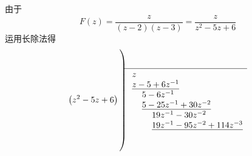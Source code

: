 \solve 由于
\[
F(z) = \dfrac{z}{(z-2)(z-3)} = \dfrac{z}{z^2 -5z + 6} 
\]
运用长除法得
\[\left( {{z^2} - 5z + 6} \right)\mathop{\left){\vphantom{1\begin{array}{l}
z\\
\underline {z - 5 + 6{z^{ - 1}}} \\
\quad {\mkern 1mu} {\mkern 1mu} {\mkern 1mu} 5 - 6{z^{ - 1}}\\
\quad {\mkern 1mu} {\mkern 1mu} {\mkern 1mu} \underline {5 - 25{z^{ - 1}} + 30{z^{ - 2}}} \\
\quad \quad {\mkern 1mu} {\mkern 1mu} {\mkern 1mu} {\mkern 1mu} {\mkern 1mu} {\mkern 1mu} 19{z^{ - 1}} - 30{z^{ - 2}}\\
\quad \quad {\mkern 1mu} {\mkern 1mu} {\mkern 1mu} {\mkern 1mu} {\mkern 1mu} {\mkern 1mu} \underline {19{z^{ - 1}} - 95{z^{ - 2}} + 114{z^{ - 3}}} \\
\quad \quad \quad \quad \quad {\mkern 1mu} {\mkern 1mu} {\mkern 1mu} {\mkern 1mu} {\mkern 1mu} 65{z^{ - 2}} - 114{z^{ - 3}}\\
\quad \quad \quad \quad \quad {\mkern 1mu} {\mkern 1mu} {\mkern 1mu} {\mkern 1mu} {\mkern 1mu} \underline {65{z^{ - 2}} - 325{z^{ - 3}} + 390{z^{ - 4}}} \\
\quad \quad \quad \quad \quad {\mkern 1mu} {\mkern 1mu} {\mkern 1mu} {\mkern 1mu} \quad \quad {\mkern 1mu} {\mkern 1mu} {\mkern 1mu} {\mkern 1mu} {\mkern 1mu} {\mkern 1mu} {\mkern 1mu} {\mkern 1mu} {\mkern 1mu} {\mkern 1mu} {\mkern 1mu} {\mkern 1mu} 211{z^{ - 3}} - 390{z^{ - 4}}\\
\quad \quad \quad \quad \quad {\mkern 1mu} {\mkern 1mu} {\mkern 1mu} {\mkern 1mu} \quad \quad {\mkern 1mu} {\mkern 1mu} {\mkern 1mu} {\mkern 1mu} {\mkern 1mu} {\mkern 1mu} {\mkern 1mu} {\mkern 1mu} {\mkern 1mu} {\mkern 1mu} {\mkern 1mu} {\mkern 1mu} \quad \quad  \cdots  \cdots 
\end{array}}}\right.
\!\!\!\!\overline{\,\,\,\vphantom 1{\begin{array}{l}
z\\
\underline {z - 5 + 6{z^{ - 1}}} \\
\quad {\mkern 1mu} {\mkern 1mu} {\mkern 1mu} 5 - 6{z^{ - 1}}\\
\quad {\mkern 1mu} {\mkern 1mu} {\mkern 1mu} \underline {5 - 25{z^{ - 1}} + 30{z^{ - 2}}} \\
\quad \quad {\mkern 1mu} {\mkern 1mu} {\mkern 1mu} {\mkern 1mu} {\mkern 1mu} {\mkern 1mu} 19{z^{ - 1}} - 30{z^{ - 2}}\\
\quad \quad {\mkern 1mu} {\mkern 1mu} {\mkern 1mu} {\mkern 1mu} {\mkern 1mu} {\mkern 1mu} \underline {19{z^{ - 1}} - 95{z^{ - 2}} + 114{z^{ - 3}}} \\

\end{array}}}}\]
